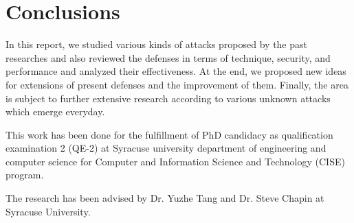 \section{Conclusions}
In this report, we studied various kinds of attacks proposed by the past researches and also reviewed the defenses in terms of technique, security, and performance and analyzed their effectiveness. At the end, we proposed new ideas for extensions of present defenses and the improvement of them. Finally, the area is subject to further extensive research according to various unknown attacks which emerge everyday.

\begin{acks}

This work has been done for the fulfillment of PhD candidacy as qualification examination 2 (QE-2) at Syracuse university department of engineering and computer science for Computer and Information Science and Technology (CISE) program.

The research has been advised by Dr. Yuzhe Tang and Dr. Steve Chapin at Syracuse University.

\end{acks}



